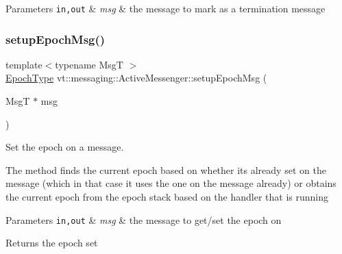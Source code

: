 \begin{DoxyParams}[1]{Parameters}
\mbox{\tt in,out}  & {\em msg} & the message to mark as a termination message \\
\hline
\end{DoxyParams}
\mbox{\label{structvt_1_1messaging_1_1_active_messenger_a7b5a8fc73617491423bf68c4fbe1e2a2}} 
\subsubsection{\texorpdfstring{setup\+Epoch\+Msg()}{setupEpochMsg()}\hspace{0.1cm}{\footnotesize\ttfamily [1/2]}}
{\footnotesize\ttfamily template$<$typename MsgT $>$ \\
\hyperlink{namespacevt_a985a5adf291c34a3ca263b3378388236}{Epoch\+Type} vt\+::messaging\+::\+Active\+Messenger\+::setup\+Epoch\+Msg (\begin{DoxyParamCaption}\item[{MsgT $\ast$}]{msg }\end{DoxyParamCaption})\hspace{0.3cm}{\ttfamily [inline]}}



Set the epoch on a message. 

The method finds the current epoch based on whether its already set on the message (which in that case it uses the one on the message already) or obtains the current epoch from the epoch stack based on the handler that is running


\begin{DoxyParams}[1]{Parameters}
\mbox{\tt in,out}  & {\em msg} & the message to get/set the epoch on\\
\hline
\end{DoxyParams}
\begin{DoxyReturn}{Returns}
the epoch set 
\end{DoxyReturn}
\mbox{\label{structvt_1_1messaging_1_1_active_messenger_ad7402f346c73b2a50ae1feb71140d891}} 
